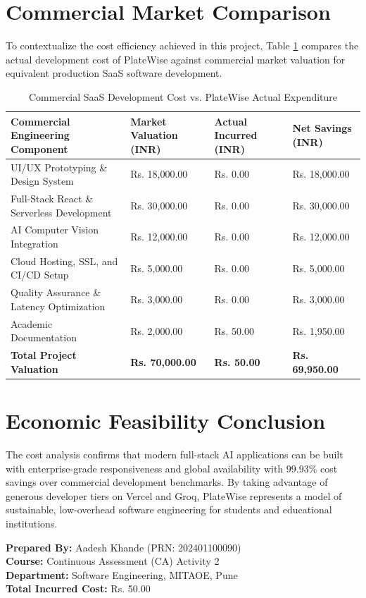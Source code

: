 \section{Commercial Market Comparison}
To contextualize the cost efficiency achieved in this project, Table \ref{tab:market_cost} compares the actual development cost of PlateWise against commercial market valuation for equivalent production SaaS software development.

\begin{table}[H]
\centering
\caption{Commercial SaaS Development Cost vs. PlateWise Actual Expenditure}
\label{tab:market_cost}
\begin{tabular}{|p{4.5cm}|p{3.0cm}|p{2.5cm}|p{3.0cm}|}
\hline
\textbf{Commercial Engineering Component} & \textbf{Market Valuation (INR)} & \textbf{Actual Incurred (INR)} & \textbf{Net Savings (INR)} \\ \hline
UI/UX Prototyping \& Design System & Rs. 18,000.00 & Rs. 0.00 & Rs. 18,000.00 \\ \hline
Full-Stack React \& Serverless Development & Rs. 30,000.00 & Rs. 0.00 & Rs. 30,000.00 \\ \hline
AI Computer Vision Integration & Rs. 12,000.00 & Rs. 0.00 & Rs. 12,000.00 \\ \hline
Cloud Hosting, SSL, and CI/CD Setup & Rs. 5,000.00 & Rs. 0.00 & Rs. 5,000.00 \\ \hline
Quality Assurance \& Latency Optimization & Rs. 3,000.00 & Rs. 0.00 & Rs. 3,000.00 \\ \hline
Academic Documentation & Rs. 2,000.00 & Rs. 50.00 & Rs. 1,950.00 \\ \hline
\textbf{Total Project Valuation} & \textbf{Rs. 70,000.00} & \textbf{Rs. 50.00} & \textbf{Rs. 69,950.00} \\ \hline
\end{tabular}
\end{table}

\section{Economic Feasibility Conclusion}
The cost analysis confirms that modern full-stack AI applications can be built with enterprise-grade responsiveness and global availability with $99.93\%$ cost savings over commercial development benchmarks. By taking advantage of generous developer tiers on Vercel and Groq, PlateWise represents a model of sustainable, low-overhead software engineering for students and educational institutions.

\bigskip
\noindent
\textbf{Prepared By:} Aadesh Khande (PRN: 202401100090) \\
\textbf{Course:} Continuous Assessment (CA) Activity 2 \\
\textbf{Department:} Software Engineering, MITAOE, Pune \\
\textbf{Total Incurred Cost:} Rs. 50.00

